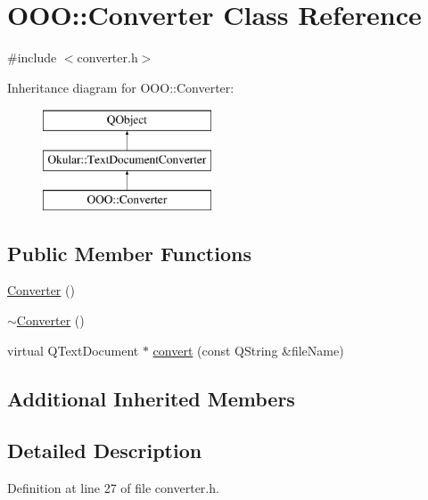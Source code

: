 \hypertarget{classOOO_1_1Converter}{\section{O\+O\+O\+:\+:Converter Class Reference}
\label{classOOO_1_1Converter}
}


{\ttfamily \#include $<$converter.\+h$>$}

Inheritance diagram for O\+O\+O\+:\+:Converter\+:\begin{figure}[H]
\begin{center}
\leavevmode
\includegraphics[height=3.000000cm]{classOOO_1_1Converter}
\end{center}
\end{figure}
\subsection*{Public Member Functions}
\begin{DoxyCompactItemize}
\item 
\hyperlink{classOOO_1_1Converter_a1de81f3e06093411e5d27ce882bc010f}{Converter} ()
\item 
\hyperlink{classOOO_1_1Converter_a9ecd05695a52c03158b81e544e13b996}{$\sim$\+Converter} ()
\item 
virtual Q\+Text\+Document $\ast$ \hyperlink{classOOO_1_1Converter_aa63e543977130604de659a4d725ee8bd}{convert} (const Q\+String \&file\+Name)
\end{DoxyCompactItemize}
\subsection*{Additional Inherited Members}


\subsection{Detailed Description}


Definition at line 27 of file converter.\+h.



